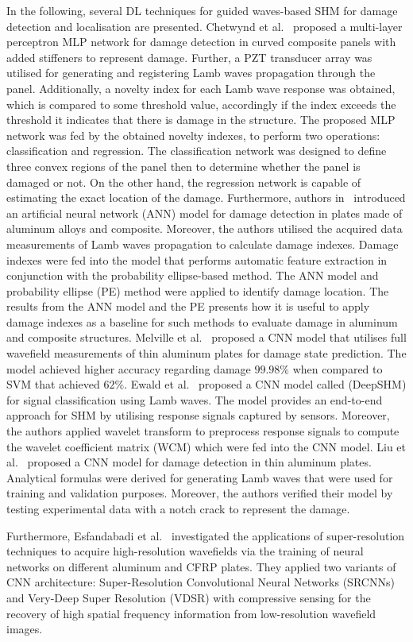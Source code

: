 In the following, several DL techniques for guided waves-based SHM for damage detection and localisation are presented.
Chetwynd et al.~\cite{Chetwynd2008} proposed a multi-layer perceptron MLP network for damage detection in curved composite panels with added stiffeners to represent damage.
Further, a PZT transducer array was utilised for generating and registering Lamb waves propagation through the panel.
Additionally, a novelty index for each Lamb wave response was obtained,
which is compared to some threshold value, accordingly if the
index exceeds the threshold it indicates that there is damage in
the structure. 
The proposed MLP network was fed by the obtained novelty indexes, to perform two operations: classification and regression. 
The classification network was designed to define three convex regions of the panel then to determine whether the panel is damaged or not. 
On the other hand, the regression network is capable of estimating the exact location of the damage. 
Furthermore, authors in~\cite{DeFenza2015} introduced an artificial neural network (ANN) model for damage detection in plates made of aluminum alloys and composite.
Moreover, the authors utilised the acquired data measurements of Lamb waves propagation to calculate damage indexes.
Damage indexes were fed into the model that performs automatic feature extraction in conjunction with the probability ellipse-based method. 
The ANN model and probability ellipse (PE) method were applied to identify damage location.
The results from the ANN model and the PE presents how it is useful to apply damage indexes as a baseline for such methods to evaluate damage in aluminum and composite structures. 
Melville et al.~\cite{Melville2018} proposed a CNN model that utilises full wavefield measurements of thin aluminum plates for damage state prediction.
The model achieved higher accuracy regarding damage \(99.98\%\) when compared to SVM that achieved \(62\%\).
Ewald et al.~\cite{Ewald2019} proposed a CNN model called (DeepSHM) for signal classification using Lamb waves.
The model provides an end-to-end approach for SHM by utilising response signals captured by sensors.
Moreover, the authors applied wavelet transform to preprocess response signals to compute the wavelet coefficient matrix (WCM) which were fed into the CNN model.
Liu et al.~\cite{Liu2020} proposed a CNN model for damage detection in thin aluminum plates.
Analytical formulas were derived for generating Lamb waves that were used for training and validation purposes.
Moreover, the authors verified their model by testing experimental data with a notch crack to represent the damage.



Furthermore, Esfandabadi et al.~\cite{esfandabadideep} investigated the applications of super-resolution techniques to acquire high-resolution wavefields via the training of neural networks on different aluminum and CFRP plates. 
They applied two variants of CNN architecture: Super-Resolution Convolutional Neural Networks (SRCNNs) and Very-Deep Super Resolution (VDSR) with compressive sensing for the recovery of high spatial frequency information from low-resolution wavefield images. 